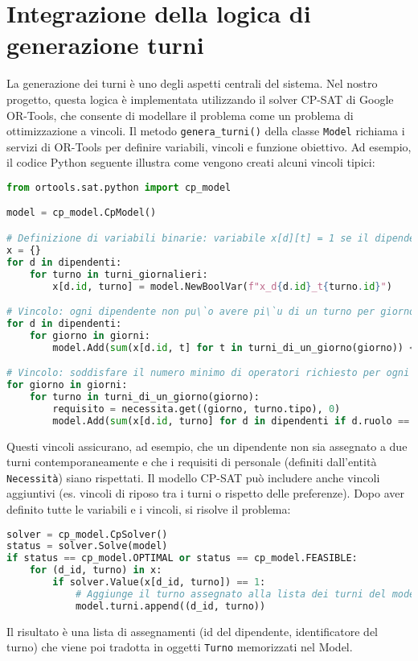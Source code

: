 \documentclass[a4paper,12pt]{report}
\begin{document}
\section{Integrazione della logica di generazione turni}
La generazione dei turni \`e uno degli aspetti centrali del sistema. Nel nostro progetto, questa logica \`e implementata utilizzando il solver CP-SAT di Google OR-Tools, che consente di modellare il problema come un problema di ottimizzazione a vincoli. Il metodo \texttt{genera\_turni()} della classe \texttt{Model} richiama i servizi di OR-Tools per definire variabili, vincoli e funzione obiettivo. Ad esempio, il codice Python seguente illustra come vengono creati alcuni vincoli tipici:
\begin{lstlisting}[language=Python]
from ortools.sat.python import cp_model

model = cp_model.CpModel()

# Definizione di variabili binarie: variabile x[d][t] = 1 se il dipendente d lavora nel turno t
x = {}
for d in dipendenti:
    for turno in turni_giornalieri:
        x[d.id, turno] = model.NewBoolVar(f"x_d{d.id}_t{turno.id}")

# Vincolo: ogni dipendente non pu\`o avere pi\`u di un turno per giorno
for d in dipendenti:
    for giorno in giorni:
        model.Add(sum(x[d.id, t] for t in turni_di_un_giorno(giorno)) <= 1)

# Vincolo: soddisfare il numero minimo di operatori richiesto per ogni turno
for giorno in giorni:
    for turno in turni_di_un_giorno(giorno):
        requisito = necessita.get((giorno, turno.tipo), 0)
        model.Add(sum(x[d.id, turno] for d in dipendenti if d.ruolo == 'infermiere') >= requisito['infermiere'])
\end{lstlisting}
Questi vincoli assicurano, ad esempio, che un dipendente non sia assegnato a due turni contemporaneamente e che i requisiti di personale (definiti dall'entit\`a \texttt{Necessit\`a}) siano rispettati. Il modello CP-SAT pu\`o includere anche vincoli aggiuntivi (es. vincoli di riposo tra i turni o rispetto delle preferenze). Dopo aver definito tutte le variabili e i vincoli, si risolve il problema:
\begin{lstlisting}[language=Python]
solver = cp_model.CpSolver()
status = solver.Solve(model)
if status == cp_model.OPTIMAL or status == cp_model.FEASIBLE:
    for (d_id, turno) in x:
        if solver.Value(x[d_id, turno]) == 1:
            # Aggiunge il turno assegnato alla lista dei turni del model
            model.turni.append((d_id, turno))
\end{lstlisting}
Il risultato \`e una lista di assegnamenti (id del dipendente, identificatore del turno) che viene poi tradotta in oggetti \texttt{Turno} memorizzati nel Model.
\end{document}
